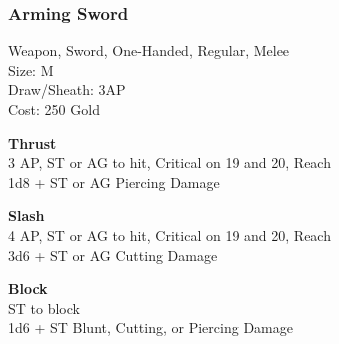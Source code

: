 \subsubsection{Arming Sword}\label{weapon:armingSword}
Weapon, Sword, One-Handed, Regular, Melee\\
Size: M\\
Draw/Sheath: 3AP\\
Cost: 250 Gold

\textbf{Thrust}\\
3 AP, ST or AG to hit, Critical on 19 and 20,  Reach\\
1d8 + \texttimes ST or AG Piercing Damage

\textbf{Slash}\\
4 AP, ST or AG to hit, Critical on 19 and 20,  Reach\\
3d6 + \texttimes ST or AG Cutting Damage

\textbf{Block}\\
ST to block\\
1d6 + \texttimes ST Blunt, Cutting, or Piercing Damage